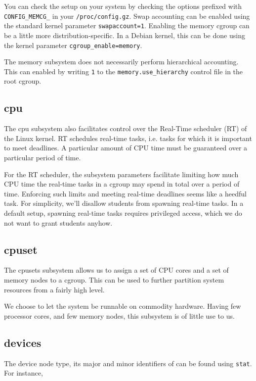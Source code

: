 You can check the setup on your system by checking the options prefixed with
\texttt{CONFIG\_MEMCG\_} in your \texttt{/proc/config.gz}. Swap accounting can
be enabled using the standard kernel parameter
\texttt{swapaccount=1}\cite{kernel-parameters.txt}. Enabling the memory cgroup
can be a little more distribution-specific.  In a Debian kernel, this can be
done using the kernel parameter
\texttt{cgroup\_enable=memory}\cite{hutchings-2011}.

The memory subsystem does not necessarily perform hierarchical accounting. This
can enabled by writing \texttt{1} to the \texttt{memory.use\_hierarchy} control
file in the root cgroup.

\subsection{cpu}

The cpu subsystem also facilitates control over the Real-Time scheduler (RT) of
the Linux kernel\cite{sched-rt-group.txt}. RT schedules real-time tasks, i.e.
tasks for which it is important to meet deadlines. A particular amount of CPU
time must be guaranteed over a particular period of time.

For the RT scheduler, the subsystem parameters facilitate limiting how much CPU
time the real-time tasks in a cgroup may spend in total over a period of time.
Enforcing such limits and meeting real-time deadlines seems like a heedful
task. For simplicity, we'll disallow students from spawning real-time tasks. In
a default setup, spawning real-time tasks requires privileged access, which we
do not want to grant students anyhow.

\subsection{cpuset}

The cpusets subsystem allows us to assign a set of CPU cores and a set of
memory nodes to a cgroup. This can be used to further partition system
resources from a fairly high level.

We choose to let the system be runnable on commodity hardware. Having few
processor cores, and few memory nodes, this subsystem is of little use to us.

\subsection{devices}

The device node type, its major and minor identifiers of can be found using
\texttt{stat}. For instance,

